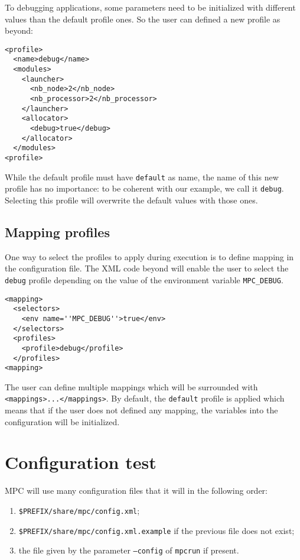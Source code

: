 \documentclass{article}
\begin{document}
To debugging applications, some parameters need to be initialized with different values than the default profile ones. So the user can defined a new profile as beyond:

\lstset{language=XML}
\begin{lstlisting}[title=Example of \texttt{debug} profile]
<profile>
  <name>debug</name>
  <modules>
    <launcher>
      <nb_node>2</nb_node>
      <nb_processor>2</nb_processor>
    </launcher>
    <allocator>
      <debug>true</debug>
    </allocator>
  </modules>
<profile>
\end{lstlisting}

\noindent While the default profile must have \texttt{default} as name, the name of this new profile has no importance: to be coherent with our example, we call it \texttt{debug}. Selecting this profile will overwrite the default values with those ones.

\subsection{Mapping profiles}

One way to select the profiles to apply during execution is to define mapping in the configuration file. The XML code beyond will enable the user to select the \texttt{debug} profile depending on the value of the environment variable \texttt{MPC\_DEBUG}.

\lstset{language=XML}
\begin{lstlisting}[title=Example of mapping to apply \texttt{debug} profile]
<mapping>
  <selectors>
    <env name=''MPC_DEBUG''>true</env>
  </selectors>
  <profiles>
    <profile>debug</profile>
  </profiles>
<mapping>
\end{lstlisting}

\noindent The user can define multiple mappings which will be surrounded with \texttt{<mappings>...</mappings>}. By default, the \texttt{default} profile is applied which means that if the user does not defined any mapping, the variables into the configuration will be initialized.

\section{Configuration test}

MPC will use many configuration files that it will in the following order:
\begin{enumerate}
\item \texttt{\$PREFIX/share/mpc/config.xml};
\item \texttt{\$PREFIX/share/mpc/config.xml.example} if the previous file does not exist;
\item the file given by the parameter \texttt{--config} of \texttt{mpcrun} if present.
\end{enumerate}
\end{document}
